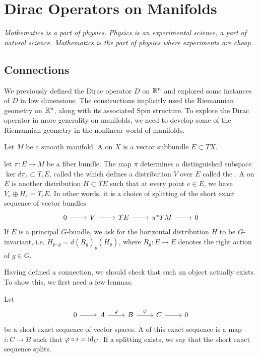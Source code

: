 \chapter{Dirac Operators on Manifolds}
%
\subsectionend $ $\\
%
\emph{Mathematics is a part of physics. Physics is an experimental science, a part of natural science. Mathematics is the part of physics where experiments are cheap.} \\
%
%
\subsectionend
%
\section{Connections}
%
We previously defined the Dirac operator $D$ on $\mathbb{R}^n$ and explored some
instances of $D$ in low dimensions. The constructions implicitly used the
Riemannian geometry on $\mathbb{R}^n$, along with its associated Spin structure.
To explore the Dirac operator in more generality on manifolds, we need to
develop some of the Riemannian geometry in the nonlinear world of manifolds.
%
\begin{defn}
Let $M$ be a smooth manifold. A  on $X$ is a vector subbundle
$E \subset TX$.
\end{defn}
%
\begin{defn}
let $\pi : E \to M$ be a fiber bundle. The map $\pi$ determines a distinguished
subspace $\ker d\pi_e \subset T_eE$, called the 
which defines a distribution $V$ over $E$ called the .
A  on $E$ is another distribution $H \subset TE$ such that
at every point $e \in E$, we have $V_e \oplus H_e = T_eE$. In other words,
it is a choice of splitting of the short exact sequence of vector bundles
\[\begin{tikzcd}
0 \ar[r] & V \ar[r] & TE \ar[r] & \pi^*TM \ar[r] & 0
\end{tikzcd}\]
If $E$ is a principal $G$-bundle, we ask for the horizontal distribution $H$
to be $G$-invariant, i.e. $H_{p \cdot g} = d(R_g)_p(H_p)$, where $R_g : E \to E$
denotes the right action of $g \in G$.
\end{defn}
Having defined a connection, we should check that such an object actually exists.
To show this, we first need a few lemmas.
%
\begin{defn}
Let
\[\begin{tikzcd}
0 \ar[r] & A \ar[r, "\varphi"] & B \ar[r, "\psi"] & C \ar[r] & 0
\end{tikzcd}\]
be a short exact sequence of vector spaces. A  of this
exact sequence is a map $i : C \to B$ such that $\varphi \circ i = \operatorname{id}_C$.
If a splitting exists, we say that the short exact sequence splits.
\end{defn}

